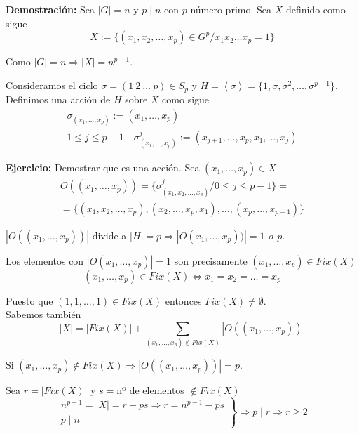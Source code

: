 \documentclass{article}
\begin{document}
\textbf{Demostración:} Sea $|G|=n$ y $p\mid n$ con $p$ número primo. Sea $X$ definido como sigue
\begin{equation*}
X:=\{(x_1,x_2,\ldots,x_p)\in G^p/x_1x_2\ldots x_p=1\}
\end{equation*}

Como $|G|=n\Rightarrow |X|=n^{p-1}$.

Consideramos el ciclo $\sigma=(1\:2\:\ldots\:p)\in S_p$ y $H=\left\langle \sigma \right\rangle = \{1,\sigma,\sigma^2,\ldots,\sigma^{p-1}\}$. \\

Definimos una acción de $H$ sobre $X$ como sigue
\begin{gather*}
\sigma_{(x_1,\ldots,x_p)}:=(x_1,\ldots,x_p) \\
1\leq j\leq p-1\quad \sigma^j_{(x_1,\ldots,x_p)}:=(x_{j+1},\ldots,x_p,x_1,\ldots,x_j)
\end{gather*}

\textbf{Ejercicio:} Demostrar que es una acción. Sea $(x_1,\ldots,x_p)\in X$
\begin{gather*}
O((x_1,\ldots,x_p))=\{\sigma^j_{(x_1,x_2,\ldots,x_p)}/0\leq j\leq p-1\}=\\
=\{(x_1,x_2,\ldots,x_p),(x_2,\ldots,x_p,x_1),\ldots,(x_p,\ldots,x_{p-1})\}
\end{gather*}

$|O((x_1,\ldots,x_p))|$ divide a $|H|=p\Rightarrow |O(x_1,\ldots,x_p))|=1\:\,o\:\,p$. 

Los elementos con $|O(x_1,\ldots,x_p)|=1$ son precisamente $(x_1,\ldots,x_p)\in Fix(X)$
\begin{equation*}
(x_1,\ldots,x_p)\in Fix(X)\Leftrightarrow x_1=x_2=\ldots=x_p
\end{equation*}

Puesto que $(1,1,\ldots,1)\in Fix(X)$ entonces $Fix(X)\neq \emptyset$. \\

Sabemos también 
\begin{equation*}
|X|=|Fix(X)|+\sum_{(x_1,\ldots,x_p)\notin Fix(X)}|O((x_1,\ldots,x_p))|
\end{equation*}

Si $(x_1,\ldots,x_p)\notin Fix(X)\Rightarrow |O((x_1,\ldots,x_p))|=p$.

Sea $r=|Fix(X)|$ y $s=$nº de elementos $\notin Fix(X)$
\begin{equation*}
\left. \begin{array}{c}
n^{p-1}=|X|=r+ps\Rightarrow r=n^{p-1}-ps \\
p\mid n
\end{array} \right\rbrace \Rightarrow p\mid r\Rightarrow r\geq 2
\end{equation*}
\end{document}
